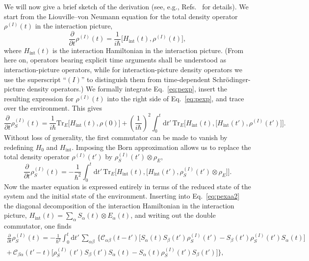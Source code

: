 \documentclass[3p,sort&compress,12pt]{elsarticle}
\newcommand{\D}{\ensuremath{\mathrm{d}}}
\newcommand{\I}{\ensuremath{i}}
\newcommand{\op}[1]{#1}
\begin{document}
We will now give a brief sketch of the derivation (see, e.g., Refs.~\cite{Breuer:2002:oq,Schlosshauer:2007:un} for details). We start from the Liouville--von Neumann equation for the total density operator $\op{\rho}^{(I)}(t)$ in the interaction picture,
%
\begin{equation}
  \label{eq:pexp}
  \frac{\partial}{\partial t} \op{\rho}^{(I)}(t) = \frac{1}{\I \hbar} \bigl[
    \op{H}_\text{int}(t),  \op{\rho}^{(I)}(t) \bigr],
\end{equation}
%
where $\op{H}_\text{int}(t)$ is the interaction Hamiltonian in the interaction picture. (From here on, operators bearing explicit time arguments shall be understood as interaction-picture operators, while for interaction-picture density operators we use the superscript ``$(I)$'' to distinguish them from time-dependent Schr\"odinger-picture density operators.)  We formally integrate Eq.~\eqref{eq:pexp}, insert the resulting expression for $\op{\rho}^{(I)}(t)$ into the right side of Eq.~\eqref{eq:pexp}, and trace over the environment. This gives
%
\begin{equation} 
\label{eq:pexps2} 
\frac{\partial}{\partial t}
  \op{\rho}^{(I)}_S(t) = \frac{1}{\I \hbar}\text{Tr}_E \bigl[ \op{H}_\text{int}(t), \op{\rho}(0) \bigr] + \left(\frac{1}{\I \hbar}\right)^2 \int_0^t \D t'
  \, \text{Tr}_E \bigl[ \op{H}_\text{int}(t), \bigl[
      \op{H}_\text{int}(t'), \op{\rho}^{(I)}(t') \bigr]
  \bigr].
\end{equation}
%
Without loss of generality, the first commutator can be made to vanish by redefining $\op{H}_0$ and $\op{H}_\text{int}$. Imposing the Born approximation allows us to replace the total density operator $\op{\rho}^{(I)}(t')$ by $\op{\rho}^{(I)}_S(t') \otimes  \op{\rho}_E$,
%
\begin{equation} 
\label{eq:pexaa2} 
\frac{\partial}{\partial t}
\op{\rho}^{(I)}_S(t) = -\frac{1}{\hbar^2} \int_0^t \D t'
\, \text{Tr}_E \bigl[ \op{H}_\text{int}(t), \bigl[
    \op{H}_\text{int}(t'),  \op{\rho}^{(I)}_S(t') \otimes
    \op{\rho}_E \bigr]
\bigr].
\end{equation}
%
Now the master equation is expressed entirely in  terms of the reduced state of the system and the initial state of the environment. Inserting into Eq.~\eqref{eq:pexaa2}  the diagonal decomposition of the interaction Hamiltonian in the interaction picture, $\op{H}_\text{int}(t) =\sum_\alpha \op{S}_\alpha(t) \otimes \op{E}_\alpha(t)$,  and writing out the double commutator, one finds
%
\begin{multline} 
\label{eq:pexa51} 
\frac{\partial}{\partial t}
\op{\rho}^{(I)}_S(t) =  - \frac{1}{\hbar^2}\int_0^t \D t'
\, \sum_{\alpha\beta} \, \biggl\{ \mathcal{C}_{\alpha\beta}(t-t') \biggl[
    \op{S}_\alpha(t) \op{S}_\beta(t') \op{\rho}^{(I)}_S(t')
    - \op{S}_\beta(t') \op{\rho}^{(I)}_S(t') \op{S}_\alpha(t)
  \biggr]   \\ + \, \mathcal{C}_{\beta\alpha}(t'-t) \biggl[
    \op{\rho}^{(I)}_S(t')\op{S}_\beta(t')  \op{S}_\alpha(t)
    - \op{S}_\alpha(t)\op{\rho}^{(I)}_S(t')\op{S}_\beta(t')
  \biggr] \biggr\},
\end{multline}
\end{document}
